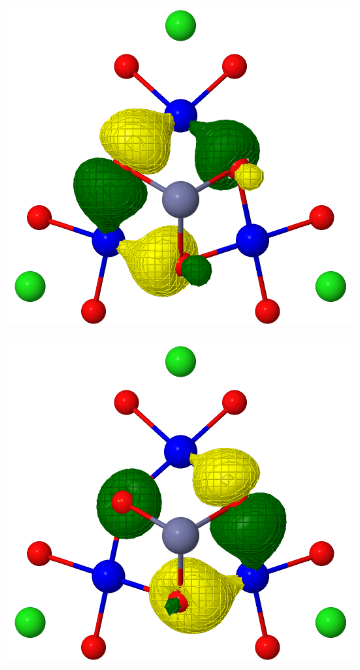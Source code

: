 \documentclass[12pt]{report}
\numberwithin{equation}{section}
\begin{document}
\begin{figure}
	\centering
	\begin{subfigure}{0.3\linewidth}
		\includegraphics[width=\linewidth]{Images/mo1.trimer.png}
		\label{fig:subfigA}
	\end{subfigure}
	\begin{subfigure}{0.3\linewidth}
		\includegraphics[width=\linewidth]{Images/mo2.trimer.png}

\end{subfigure}
\end{figure}
\end{document}
